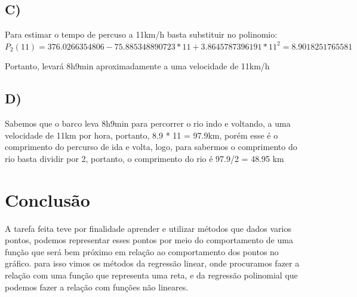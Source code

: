 \documentclass{article}
\begin{document}
    \subsection*{C)}\hspace{0.5cm}Para estimar o tempo de percuso a 11km/h basta substituir no polinomio:\\
    $P_2(11) = 376.0266354806 -75.885348890723*11 + 3.8645787396191*11^2 = 8.9018251765581$
    
    Portanto, levará 8h9min aproximadamente a uma velocidade de 11km/h
    
    
    \subsection*{D)}\hspace{0.5cm}Sabemos que o barco leva 8h9min para percorrer o rio indo e voltando, a uma velocidade de 11km por hora, portanto, 8.9 * 11 = 97.9km, porém esse é o comprimento do percurso de ida e volta, logo, para sabermos o comprimento do rio basta dividir por 2, portanto, o comprimento do rio é 97.9/2 = 48.95 km
    
    
\section*{Conclusão}
\hspace{0.5cm}A tarefa feita teve por finalidade aprender e utilizar métodos que dados varios pontos, podemos representar esses pontos por meio do comportamento de uma função que será bem próximo em relação ao comportamento dos pontos no gráfico. para isso vimos os métodos da regressão linear, onde procuramos fazer a relação com uma função que representa uma reta, e da regressão polinomial que podemos fazer a relação com funções não lineares.
\end{document}

